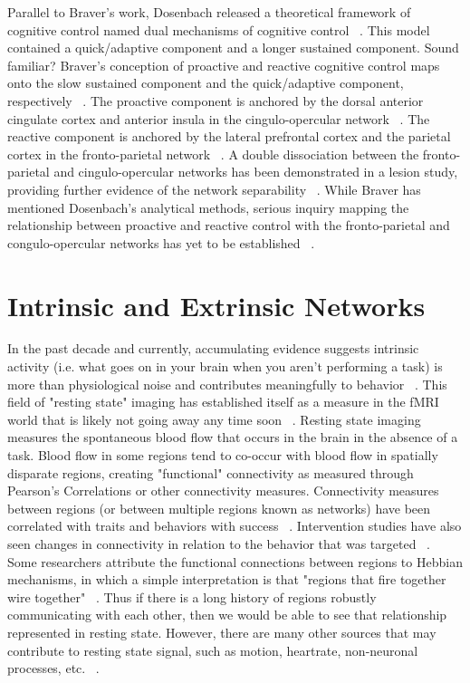 \documentclass[phd,appendix,figures]{uithesis}
\begin{document}
Parallel to Braver's work, Dosenbach released a theoretical framework of cognitive control named dual mechanisms of cognitive control ~\citep{Dosenbach2007}. 
This model contained a quick/adaptive component and a longer sustained component.
Sound familiar?
Braver's conception of proactive and reactive cognitive control maps onto the slow sustained component and the quick/adaptive component, respectively ~\citep{Braver2012}.
The proactive component is anchored by the dorsal anterior cingulate cortex and anterior insula in the cingulo-opercular network ~\citep{Dosenbach2008}.
The reactive component is anchored by the lateral prefrontal cortex and the parietal cortex in the fronto-parietal network ~\citep{Dosenbach2008}.
A double dissociation between the fronto-parietal and cingulo-opercular networks has been demonstrated in a lesion study, providing further evidence of the network separability ~\citep{nomura2010b}.
While Braver has mentioned Dosenbach's analytical methods, serious inquiry mapping the relationship between proactive and reactive control with the fronto-parietal and congulo-opercular networks has yet to be established ~\citep{Braver2006,Cooper2015}.

\section{Intrinsic and Extrinsic Networks}

In the past decade and currently, accumulating evidence suggests intrinsic activity (i.e. what goes on in your brain when you aren't performing a task) is more than physiological noise and contributes meaningfully to behavior ~\citep{Busch2010,Kenet2003,McCormick1999,Mateo2017}.
This field of "resting state" imaging has established itself as a measure in the fMRI world that is likely not going away any time soon ~\citep{VandenHeuvel2010,Shen2015}.
Resting state imaging measures the spontaneous blood flow that occurs in the brain in the absence of a task.
Blood flow in some regions tend to co-occur with blood flow in spatially disparate regions, creating "functional" connectivity as measured through Pearson's Correlations or other connectivity measures.
Connectivity measures between regions (or between multiple regions known as networks) have been correlated with traits and behaviors with success ~\citep{Dennis2011,Duchek2013}.
Intervention studies have also seen changes in connectivity in relation to the behavior that was targeted ~\citep{Horowitz-Kraus2015}.
Some researchers attribute the functional connections between regions to Hebbian mechanisms, in which a simple interpretation is that "regions that fire together wire together" ~\citep{Harmelech2013}.
Thus if there is a long history of regions robustly communicating with each other, then we would be able to see that relationship represented in resting state.
However, there are many other sources that may contribute to resting state signal, such as motion, heartrate, non-neuronal processes, etc. ~\citep{Winder2017,Murphy2013}.
\end{document}
